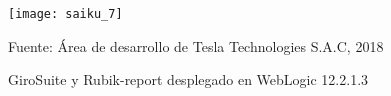 \begin{spacing}{1.5}
	\begin{figure}[H]
		\centering
		\texttt{[image: saiku\_7]}
		\caption {\centering \small{GiroSuite y Rubik-report desplegado en WebLogic 12.2.1.3}} \label{figure:chaperIII_10}
		\small {Fuente: \'{A}rea de desarrollo de Tesla Technologies S.A.C, 2018}
	\end{figure}
	
	
	
	
	
\end{spacing}